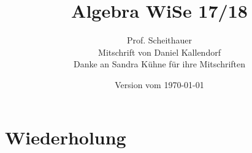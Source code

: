 \newcommand{\Kern}{\operatorname{Kern}}
\newcommand{\Img}{\operatorname{Im}}
\newcommand{\Potset}{\mathscr P}
\newcommand{\Hom}{\operatorname{Hom}}
\newcommand{\Aut}{\operatorname{Aut}}
\newcommand{\Fr}{\operatorname{Fr}}

\newcommand{\scA}{\mathscr A}
\newcommand{\scB}{\mathscr B}
\newcommand{\scE}{\mathscr E}
\newcommand{\scF}{\ensuremath{\mathscr{F}}}
\newcommand{\scG}{\mathscr G}
\newcommand{\scL}{\mathscr L}
\newcommand{\scO}{\mathscr O}

\theoremstyle{plain}
\newtheorem{theorem}{Theorem}[section]
\newtheorem{lem}[theorem]{Lemma}
\newtheorem{kor}[theorem]{Korollar}
\newtheorem{satz}[theorem]{Satz}
\newtheorem{rem}[theorem]{Erinnerung}
\newtheorem*{rem*}{Erinnerung}

\theoremstyle{definition}
\newtheorem{definition}[theorem]{Definition}
\newtheorem{prop}[theorem]{Proposition}

\theoremstyle{remark}
\newtheorem{bem}[theorem]{Bemerkung}
\newtheorem*{bem*}{Bemerkung}
\newtheorem{exm}[theorem]{Beispiel}
\newtheorem*{exm*}{Beispiel}

\newcommand{\hideenv}[2][]{
	\expandafter\renewcommand\csname#2\endcsname{\ifthenelse{\isempty{#1}}{ }{\stepcounter{#1} }\killcontent}
	\expandafter\renewcommand\csname end#2\endcsname{\endkillcontent\vspace{-0.6\baselineskip}}
}




\title{Algebra WiSe 17/18}
\author{Prof. Scheithauer\\
Mitschrift von Daniel Kallendorf\\
\small Danke an Sandra Kühne für ihre Mitschriften}
\date{Version vom \today}


	
	\maketitle
	\tableofcontents
	
	\section{Wiederholung}
	
